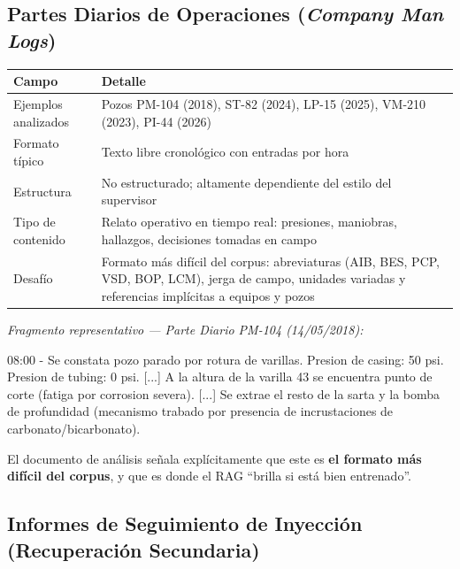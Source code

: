 \documentclass[12pt, a4paper]{article}
\begin{document}
\subsection{Partes Diarios de Operaciones (\textit{Company Man Logs})}

\begin{tabularx}{\textwidth}{BL}
  \toprule
  \textbf{Campo} & \textbf{Detalle} \\
  \midrule
  Ejemplos analizados & Pozos PM-104 (2018), ST-82 (2024), LP-15 (2025),
                        VM-210 (2023), PI-44 (2026) \\
  \addlinespace
  Formato t\'{i}pico  & Texto libre cronol\'{o}gico con entradas por hora \\
  \addlinespace
  Estructura          & No estructurado; altamente dependiente del estilo del supervisor \\
  \addlinespace
  Tipo de contenido   & Relato operativo en tiempo real: presiones, maniobras, hallazgos,
                        decisiones tomadas en campo \\
  \addlinespace
  Desaf\'{i}o         & Formato m\'{a}s dif\'{i}cil del corpus: abreviaturas (AIB, BES, PCP,
                        VSD, BOP, LCM), jerga de campo, unidades variadas y referencias
                        impl\'{i}citas a equipos y pozos \\
  \bottomrule
\end{tabularx}

\vspace{6pt}
\textit{Fragmento representativo --- Parte Diario PM-104 (14/05/2018):}

\begin{fragmentbox}
08:00 - Se constata pozo parado por rotura de varillas. Presion de casing: 50 psi.
Presion de tubing: 0 psi.
[...]
A la altura de la varilla 43 se encuentra punto de corte (fatiga por corrosion severa).
[...]
Se extrae el resto de la sarta y la bomba de profundidad (mecanismo trabado por
presencia de incrustaciones de carbonato/bicarbonato).
\end{fragmentbox}

El documento de an\'{a}lisis se\~{n}ala expl\'{i}citamente que este es \textbf{el formato m\'{a}s
dif\'{i}cil del corpus}, y que es donde el RAG ``brilla si est\'{a} bien entrenado''.

\subsection{Informes de Seguimiento de Inyecci\'{o}n (Recuperaci\'{o}n Secundaria)}
\end{document}
